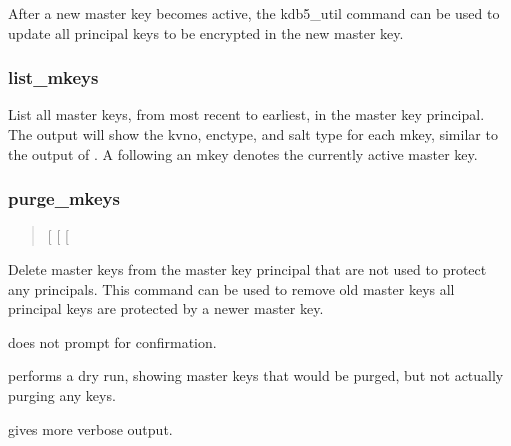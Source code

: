 \documentclass[letterpaper,10pt,english]{sphinxmanual}
\begin{document}
\sphinxAtStartPar
After a new master key becomes active, the kdb5\_util
 command can be used to update all
principal keys to be encrypted in the new master key.


\subsubsection{list\_mkeys}
\label{\detokenize{admin/admin_commands/kdb5_util:list-mkeys}}\begin{quote}

\sphinxAtStartPar
{}
\end{quote}

\sphinxAtStartPar
List all master keys, from most recent to earliest, in the master key
principal.  The output will show the kvno, enctype, and salt type for
each mkey, similar to the output of {\hyperref[\detokenize{admin/admin_commands/kadmin_local:kadmin-1}]{}} .  A
\sphinxcode{\sphinxupquote{*}} following an mkey denotes the currently active master key.


\subsubsection{purge\_mkeys}
\label{\detokenize{admin/admin_commands/kdb5_util:purge-mkeys}}\begin{quote}

\sphinxAtStartPar
{} {[}\sphinxstylestrong{\sphinxhyphen{}f}{]} {[}\sphinxstylestrong{\sphinxhyphen{}n}{]} {[}\sphinxstylestrong{\sphinxhyphen{}v}{]}
\end{quote}

\sphinxAtStartPar
Delete master keys from the master key principal that are not used to
protect any principals.  This command can be used to remove old master
keys all principal keys are protected by a newer master key.
\begin{description}
\sphinxAtStartPar
does not prompt for confirmation.

\sphinxAtStartPar
performs a dry run, showing master keys that would be purged, but
not actually purging any keys.

\sphinxAtStartPar
gives more verbose output.

\end{description}
\end{document}
